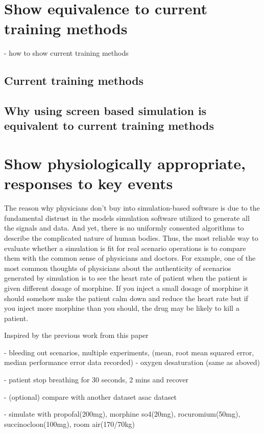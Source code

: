 \documentclass[a4paper]{article}
\begin{document}
\section{Show equivalence to current training methods}

- how to show current training methods

\subsection{Current training methods}
\subsection{Why using screen based simulation is equivalent to current training methods}

\section{Show physiologically appropriate, responses to key events}

The reason why physicians don't buy into simulation-based software is due to the fundamental distrust in the models simulation software utilized to generate all the signals and data. And yet, there is no uniformly consented algorithms to describe the complicated nature of human bodies. Thus, the most reliable way to evaluate whether a simulation is fit for real scenario operations is to compare them with the common sense of physicians and doctors. For example, one of the most common thoughts of physicians about the authenticity of scenarios generated by simulation is to see the heart rate of patient when the patient is given different dosage of morphine. If you inject a small dosage of morphine it should somehow make the patient calm down and reduce the heart rate but if you inject more morphine than you should, the drug may be likely to kill a patient. 

Inspired by the previous work from this paper \cite{measure_repeatability}

- bleeding out scenarios, multiple experiments, (mean, root mean squared error, median performance error data recorded)
- oxygen desaturation (same as aboved)

- patient stop breathing for 30 seconds, 2 mins and recover

- (optional) compare with another dataset asac dataset

- simulate with propofal(200mg), morphine so4(20mg), rocuromium(50mg), succinocloon(100mg), room air(170/70kg)
\end{document}
